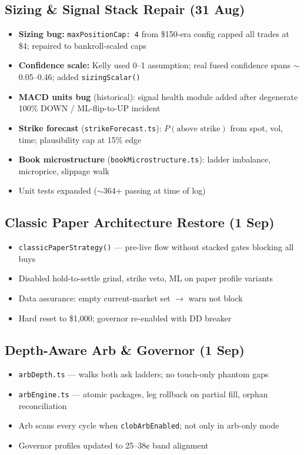 \documentclass[11pt,a4paper]{article}
\begin{document}
\subsection{Sizing \& Signal Stack Repair (31 Aug)}
\begin{itemize}[noitemsep]
  \item \textbf{Sizing bug:} \texttt{maxPositionCap: 4} from \$150-era config capped all trades at \$4; repaired to bankroll-scaled caps
  \item \textbf{Confidence scale:} Kelly used 0--1 assumption; real fused confidence spans $\sim$0.05--0.46; added \texttt{sizingScalar()}
  \item \textbf{MACD units bug} (historical): signal health module added after degenerate 100\% DOWN / ML-flip-to-UP incident
  \item \textbf{Strike forecast} (\texttt{strikeForecast.ts}): $P(\text{above strike})$ from spot, vol, time; plausibility cap at 15\% edge
  \item \textbf{Book microstructure} (\texttt{bookMicrostructure.ts}): ladder imbalance, microprice, slippage walk
  \item Unit tests expanded ($\sim$364+ passing at time of log)
\end{itemize}

\subsection{Classic Paper Architecture Restore (1 Sep)}
\begin{itemize}[noitemsep]
  \item \texttt{classicPaperStrategy()} --- pre-live flow without stacked gates blocking all buys
  \item Disabled hold-to-settle grind, strike veto, ML on paper profile variants
  \item Data assurance: empty current-market set $\rightarrow$ warn not block
  \item Hard reset to \$1{,}000; governor re-enabled with DD breaker
\end{itemize}

\subsection{Depth-Aware Arb \& Governor (1 Sep)}
\begin{itemize}[noitemsep]
  \item \texttt{arbDepth.ts} --- walks both ask ladders; no touch-only phantom gaps
  \item \texttt{arbEngine.ts} --- atomic packages, leg rollback on partial fill, orphan reconciliation
  \item Arb scans every cycle when \texttt{clobArbEnabled}; not only in arb-only mode
  \item Governor profiles updated to 25--38¢ band alignment
\end{itemize}
\end{document}
